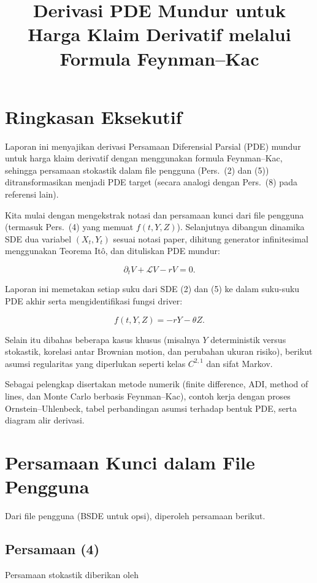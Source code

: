 \documentclass[12pt,a4paper]{article}
\title{Derivasi PDE Mundur untuk Harga Klaim Derivatif melalui Formula Feynman--Kac}
\author{}
\date{}
\begin{document}
\maketitle

\section*{Ringkasan Eksekutif}

Laporan ini menyajikan derivasi Persamaan Diferensial Parsial (PDE) mundur untuk harga klaim derivatif dengan menggunakan formula Feynman--Kac, sehingga persamaan stokastik dalam file pengguna (Pers.~(2) dan (5)) ditransformasikan menjadi PDE target (secara analogi dengan Pers.~(8) pada referensi lain).

Kita mulai dengan mengekstrak notasi dan persamaan kunci dari file pengguna (termasuk Pers.~(4) yang memuat $f(t,Y,Z)$). Selanjutnya dibangun dinamika SDE dua variabel $(X_t,Y_t)$ sesuai notasi paper, dihitung generator infinitesimal menggunakan Teorema It\^o, dan dituliskan PDE mundur:

\[
\partial_t V+\mathcal L V-rV=0.
\]

Laporan ini memetakan setiap suku dari SDE (2) dan (5) ke dalam suku-suku PDE akhir serta mengidentifikasi fungsi driver:

\[
f(t,Y,Z)=-rY-\theta Z.
\]

Selain itu dibahas beberapa kasus khusus (misalnya $Y$ deterministik versus stokastik, korelasi antar Brownian motion, dan perubahan ukuran risiko), berikut asumsi regularitas yang diperlukan seperti kelas $C^{2,1}$ dan sifat Markov.

Sebagai pelengkap disertakan metode numerik (finite difference, ADI, method of lines, dan Monte Carlo berbasis Feynman--Kac), contoh kerja dengan proses Ornstein--Uhlenbeck, tabel perbandingan asumsi terhadap bentuk PDE, serta diagram alir derivasi.

\section{Persamaan Kunci dalam File Pengguna}

Dari file pengguna (BSDE untuk opsi), diperoleh persamaan berikut.

\subsection*{Persamaan (4)}

Persamaan stokastik diberikan oleh
\end{document}
